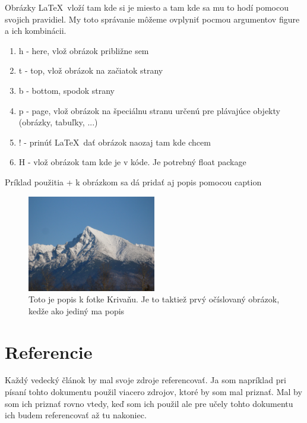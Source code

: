 \documentclass[11pt, a4paper]{article}
\begin{document}
Obrázky \LaTeX\ vloží tam kde si je miesto a tam kde sa mu to hodí pomocou svojich pravidiel. My toto správanie môžeme ovplyniť pocmou argumentov figure a ich kombinácii. 
\begin{enumerate}
\item h - here, vlož obrázok približne sem
\item t - top, vlož obrázok na začiatok strany
\item b - bottom, spodok strany
\item p - page, vlož obrázok na špeciálnu stranu určenú pre plávajúce objekty (obrázky, tabuľky, ...)
\item ! - prinúť \LaTeX\ dať obrázok naozaj tam kde chcem
\item H - vlož obrázok tam kde je v kóde. Je potrebný float package
\end{enumerate}
Príklad použitia + k obrázkom sa dá pridať aj popis pomocou caption
\begin{figure}[H]
  \centering
      \includegraphics[width=0.5\textwidth]{krivan}
      \caption{Toto je popis k fotke Krivaňu. Je to taktiež prvý očíslovaný obrázok, kedže ako jediný ma popis}
\end{figure}

\clearpage
\newpage
\section{Referencie} \label{sec:referencie}
Každý vedecký článok by mal svoje zdroje referencovať. Ja som napríklad pri písaní tohto dokumentu použil viacero zdrojov, ktoré by som mal priznať. Mal by som ich priznať rovno vtedy, keď som ich použil ale pre učely tohto dokumentu ich budem referencovať až tu nakoniec.
\end{document}
